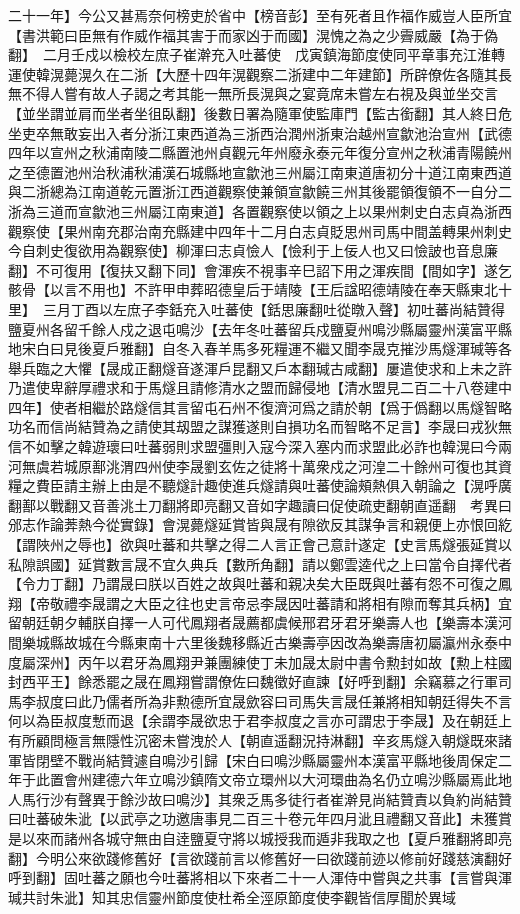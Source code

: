 二十一年】今公又甚焉奈何榜吏於省中【榜音彭】至有死者且作福作威豈人臣所宜【書洪範曰臣無有作威作福其害于而家凶于而國】滉愧之為之少霽威嚴【為于偽翻】　二月壬戍以檢校左庶子崔澣充入吐蕃使　戊寅鎮海節度使同平章事充江淮轉運使韓滉薨滉久在二浙【大歷十四年滉觀察二浙建中二年建節】所辟僚佐各隨其長無不得人嘗有故人子謁之考其能一無所長滉與之宴竟席未嘗左右視及與並坐交言【並坐謂並肩而坐者坐徂臥翻】後數日署為隨軍使監庫門【監古銜翻】其人終日危坐吏卒無敢妄出入者分浙江東西道為三浙西治潤州浙東治越州宣歙池治宣州【武德四年以宣州之秋浦南陵二縣置池州貞觀元年州廢永泰元年復分宣州之秋浦青陽饒州之至德置池州治秋浦秋浦漢石城縣地宣歙池三州屬江南東道唐初分十道江南東西道與二浙總為江南道乾元置浙江西道觀察使兼領宣歙饒三州其後罷領復領不一自分二浙為三道而宣歙池三州屬江南東道】各置觀察使以領之上以果州刺史白志貞為浙西觀察使【果州南充郡治南充縣建中四年十二月白志貞貶思州司馬中間盖轉果州刺史今自刺史復欲用為觀察使】柳渾曰志貞憸人【憸利于上佞人也又曰憸詖也音息廉翻】不可復用【復扶又翻下同】會渾疾不視事辛巳詔下用之渾疾間【間如字】遂乞骸骨【以言不用也】不許甲申葬昭德皇后于靖陵【王后諡昭德靖陵在奉天縣東北十里】　三月丁酉以左庶子李銛充入吐蕃使【銛思廉翻吐從暾入聲】初吐蕃尚結贊得鹽夏州各留千餘人戍之退屯鳴沙【去年冬吐蕃留兵戍鹽夏州鳴沙縣屬靈州漢富平縣地宋白曰見後夏戶雅翻】自冬入春羊馬多死糧運不繼又聞李晟克摧沙馬燧渾瑊等各舉兵臨之大懼【晟成正翻燧音遂渾戶昆翻又戶本翻瑊古咸翻】屢遣使求和上未之許乃遣使卑辭厚禮求和于馬燧且請修清水之盟而歸侵地【清水盟見二百二十八卷建中四年】使者相繼於路燧信其言留屯石州不復濟河爲之請於朝【爲于僞翻以馬燧智略功名而信尚結贊為之請使其刼盟之謀獲遂則自損功名而智略不足言】李晟曰戎狄無信不如擊之韓遊瓌曰吐蕃弱則求盟彊則入寇今深入塞内而求盟此必詐也韓滉曰今兩河無虞若城原鄯洮渭四州使李晟劉玄佐之徒將十萬衆戍之河湟二十餘州可復也其資糧之費臣請主辦上由是不聽燧計趣使進兵燧請與吐蕃使論頰熱俱入朝論之【滉呼廣翻鄯以戰翻又音善洮土刀翻將即亮翻又音如字趣讀曰促使疏吏翻朝直遥翻　考異曰邠志作論莾熱今從實錄】會滉薨燧延賞皆與晟有隙欲反其謀争言和親便上亦恨回紇【謂陜州之辱也】欲與吐蕃和共擊之得二人言正會己意計遂定【史言馬燧張延賞以私隙誤國】延賞數言晟不宜久典兵【數所角翻】請以鄭雲逵代之上曰當令自擇代者【令力丁翻】乃謂晟曰朕以百姓之故與吐蕃和親决矣大臣既與吐蕃有怨不可復之鳳翔【帝敬禮李晟謂之大臣之往也史言帝忌李晟因吐蕃請和將相有隙而奪其兵柄】宜留朝廷朝夕輔朕自擇一人可代鳳翔者晟薦都虞候邢君牙君牙樂壽人也【樂壽本漢河間樂城縣故城在今縣東南十六里後魏移縣近古樂壽亭因改為樂壽唐初屬瀛州永泰中度屬深州】丙午以君牙為鳳翔尹兼團練使丁未加晟太尉中書令勲封如故【勲上柱國封西平王】餘悉罷之晟在鳳翔嘗謂僚佐曰魏徵好直諫【好呼到翻】余竊慕之行軍司馬李叔度曰此乃儒者所為非勲德所宜晟歛容曰司馬失言晟任兼將相知朝廷得失不言何以為臣叔度慙而退【余謂李晟欲忠于君李叔度之言亦可謂忠于李晟】及在朝廷上有所顧問極言無隱性沉密未嘗洩於人【朝直遥翻況持淋翻】辛亥馬燧入朝燧既來諸軍皆閉壁不戰尚結贊遽自鳴沙引歸【宋白曰鳴沙縣屬靈州本漢富平縣地後周保定二年于此置會州建德六年立鳴沙鎮隋文帝立環州以大河環曲為名仍立鳴沙縣屬焉此地人馬行沙有聲異于餘沙故曰鳴沙】其衆乏馬多徒行者崔澣見尚結贊責以負約尚結贊曰吐蕃破朱泚【以武亭之功邀唐事見二百三十卷元年四月泚且禮翻又音此】未獲賞是以來而諸州各城守無由自逹鹽夏守將以城授我而遁非我取之也【夏戶雅翻將即亮翻】今明公來欲踐修舊好【言欲踐前言以修舊好一曰欲踐前迹以修前好踐慈演翻好呼到翻】固吐蕃之願也今吐蕃將相以下來者二十一人渾侍中嘗與之共事【言嘗與渾瑊共討朱泚】知其忠信靈州節度使杜希全涇原節度使李觀皆信厚聞於異域